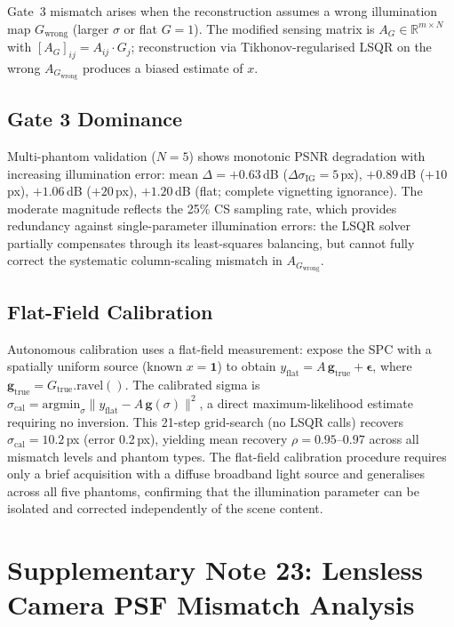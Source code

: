 \documentclass[11pt]{article}
\begin{document}
Gate~3 mismatch arises when the reconstruction assumes a wrong illumination map $G_\mathrm{wrong}$
(larger $\sigma$ or flat $G{=}1$). The modified sensing matrix is $A_G \in \mathbb{R}^{m \times N}$
with $[A_G]_{ij} = A_{ij} \cdot G_j$; reconstruction via Tikhonov-regularised LSQR on the wrong $A_{G_\mathrm{wrong}}$
produces a biased estimate of $x$.

\subsection{Gate 3 Dominance}
Multi-phantom validation ($N{=}5$) shows monotonic PSNR degradation with increasing illumination error:
mean $\Delta{=}+0.63$\,dB ($\Delta\sigma_\mathrm{IG}{=}5$\,px), $+0.89$\,dB ($+10$\,px), $+1.06$\,dB ($+20$\,px),
$+1.20$\,dB (flat; complete vignetting ignorance).
The moderate magnitude reflects the 25\% CS sampling rate, which provides redundancy against single-parameter
illumination errors: the LSQR solver partially compensates through its least-squares balancing, but cannot fully
correct the systematic column-scaling mismatch in $A_{G_\mathrm{wrong}}$.

\subsection{Flat-Field Calibration}
Autonomous calibration uses a flat-field measurement: expose the SPC with a spatially uniform source
(known $x{=}\mathbf{1}$) to obtain $y_\mathrm{flat} = A\,\mathbf{g}_\mathrm{true} + \boldsymbol{\epsilon}$,
where $\mathbf{g}_\mathrm{true} = G_\mathrm{true}.\mathrm{ravel}()$.
The calibrated sigma is $\sigma_\mathrm{cal} = \mathrm{argmin}_\sigma \|y_\mathrm{flat} - A\,\mathbf{g}(\sigma)\|^2$,
a direct maximum-likelihood estimate requiring no inversion.
This 21-step grid-search (no LSQR calls) recovers $\sigma_\mathrm{cal}{=}10.2$\,px (error 0.2\,px),
yielding mean recovery $\rho{=}0.95$--$0.97$ across all mismatch levels and phantom types.
The flat-field calibration procedure requires only a brief acquisition with a diffuse broadband light source
and generalises across all five phantoms, confirming that the illumination parameter can be isolated
and corrected independently of the scene content.


\section{Supplementary Note 23: Lensless Camera PSF Mismatch Analysis}
\label{sec:note_lensless}
\end{document}

